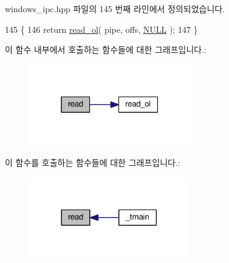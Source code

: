 windows\+\_\+ipc.\+hpp 파일의 145 번째 라인에서 정의되었습니다.


\begin{DoxyCode}
145                                             \{
146             \textcolor{keywordflow}{return} \hyperlink{class_windows_n_pipe_message_a25ac1b47d55092db7e7204a83f6d3367}{read\_ol}( pipe, offs, \hyperlink{openavb__types__base__pub_8h_a070d2ce7b6bb7e5c05602aa8c308d0c4}{NULL} );
147         \}
\end{DoxyCode}


이 함수 내부에서 호출하는 함수들에 대한 그래프입니다.\+:
\nopagebreak
\begin{figure}[H]
\begin{center}
\leavevmode
\includegraphics[width=199pt]{class_windows_n_pipe_message_aefaf53a62a09b658795b4bff415c8c68_cgraph}
\end{center}
\end{figure}




이 함수를 호출하는 함수들에 대한 그래프입니다.\+:
\nopagebreak
\begin{figure}[H]
\begin{center}
\leavevmode
\includegraphics[width=197pt]{class_windows_n_pipe_message_aefaf53a62a09b658795b4bff415c8c68_icgraph}
\end{center}
\end{figure}



